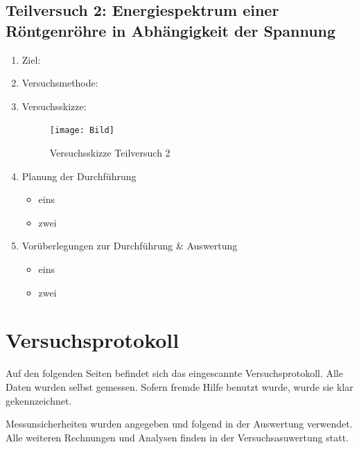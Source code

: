 \documentclass{article}
\begin{document}
\newpage

\subsection{Teilversuch 2: Energiespektrum einer Röntgenröhre in Abhängigkeit der Spannung}
\begin{enumerate}[label = (\Roman*)]
    \item Ziel: 
    
    \item Versuchsmethode: 
    
    \item Versuchsskizze:
    
        \begin{figure}[H]
        \centering
        \texttt{[image: Bild]}
        \caption{Versuchsskizze Teilversuch 2}
        \end{figure}

    \item Planung der Durchführung
        \begin{itemize}
           \item eins
           \item zwei
        \end{itemize}

    \item Vorüberlegungen zur Durchführung \& Auswertung
        \begin{itemize}
            \item eins
            \item zwei
        \end{itemize}
        
\end{enumerate}


\newpage

\section{Versuchsprotokoll}

Auf den folgenden Seiten befindet sich das eingescannte Versuchsprotokoll.
Alle Daten wurden selbst gemessen. Sofern fremde Hilfe benutzt wurde,
wurde sie klar gekennzeichnet.

Messunsicherheiten wurden angegeben und folgend in der Auswertung verwendet.
Alle weiteren Rechnungen und Analysen finden in der Versuchsasuwertung statt.


\end{document}
